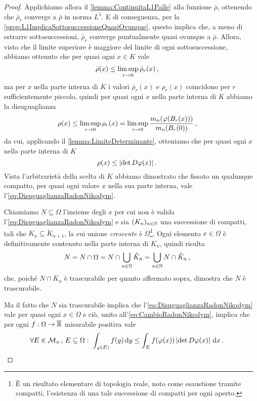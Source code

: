 \begin{proof}
	Applichiamo allora il \cref{lemma:ContinuitaL1Palle} alla funzione $\bar\rho$, ottenendo che $\bar\rho_r$ converge a $\bar\rho$ in norma $L^1$.
	E di conseguenza, per la \cref{prop:L1ImplicaSottosuccessioneQuasiOvunque}, questo implica che, a meno di estrarre sottosuccessioni, $\bar\rho_r$ converge puntualmente quasi ovunque a $\bar\rho$.
	Allora, visto che il limite superiore è maggiore del limite di ogni sottosuccessione, abbiamo ottenuto che per quasi ogni $x\in K$ vale
	\begin{equation*}
		\bar\rho(x)\le \limsup_{r\to 0} \bar\rho_r(x)\, \text{, }
	\end{equation*}
	ma per $x$ nella parte interna di $K$ i valori $\bar\rho_r(x)$ e $\rho_r(x)$ coincidono per $r$ sufficientemente piccolo, quindi per quasi ogni $x$ nella parte interna di $K$ abbiamo la disuguaglianza
	\begin{equation*}
		\rho(x)\le \limsup_{r\to 0} \rho_r(x)=\limsup_{r\to 0} \frac{m_n(\varphi(B_r(x)))}{m_n(B_r(0))}\, \text{, }
	\end{equation*}
	da cui, applicando il \cref{lemma:LimiteDeterminante}, otteniamo che per quasi ogni $x$ nella parte interna di $K$
	\begin{equation}\label{eq:DisuguaglianzaRadonNikodym}
		\rho(x)\le \lvert \det D\varphi(x)\rvert \, \text{. }
	\end{equation}
	Vista l'arbitrarietà della scelta di $K$ abbiamo dimostrato che fissato un qualunque compatto, per quasi ogni valore $x$ nella sua parte interna, vale l'\cref{eq:DisuguaglianzaRadonNikodym}. 
	
	Chiamiamo $N\subseteq\Omega$ l'insieme degli $x$ per cui non è valida l'\cref{eq:DisuguaglianzaRadonNikodym} e sia $(K_n)_{n\in\mathbb N}$ una successione di compatti, tali che $K_n\subseteq \mathring K_{n+1}$, la cui unione \emph{crescente} è $\Omega$\footnote{È un risultato elementare di topologia reale, noto come esaustione tramite compatti, l'esistenza di una tale successione di compatti per ogni aperto.}.
	Ogni elemento $x\in\Omega$ è definitivamente contenuto nella parte interna di $K_n$, quindi risulta
	\begin{equation*}
		N=N\cap\Omega=N\cap\bigcup_{n\in\mathbb N} \mathring K_n=\bigcup_{n\in\mathbb N}N\cap\mathring K_n\, \text{, }
	\end{equation*}
	che, poiché $N\cap\mathring{K_n}$ è trascurabile per quanto affermato sopra, dimostra che $N$ è trascurabile.
	
	Ma il fatto che $N$ sia trascurabile implica che l'\cref{eq:DisuguaglianzaRadonNikodym} vale per quasi ogni $x\in\Omega$ e ciò, unito all'\cref{eq:CambioRadonNikodym}, implica che per ogni $f:\Omega\to\overline{\mathbb R}$ misurabile positiva vale
	\begin{equation*}
		\forall E\in \mathcal M_n\, \text{, } E\subseteq\Omega:\ \int_{\varphi(E)} f(y)\,\mathrm d y\le 
		\int_E f(\varphi(x))\left\lvert\det D\varphi(x)\right\rvert\,\mathrm d x \, \text{. }
	\end{equation*}
	

\end{proof}
